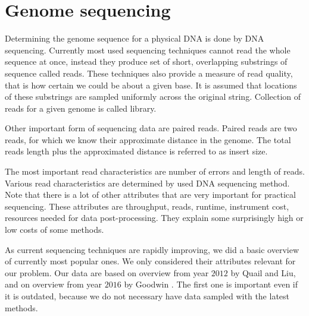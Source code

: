 \section{Genome sequencing}

Determining the genome sequence for a physical DNA is done by DNA sequencing. 
Currently most used sequencing techniques cannot read the whole sequence at once,
instead they produce set of short, overlapping substrings of sequence called reads. 
These techniques also provide a measure of read quality, that is how certain we could be about a given base.
It is assumed that locations of these substrings are sampled uniformly across the original string.
Collection of reads for a given genome is called library.

Other important form of sequencing data are paired reads. 
Paired reads are two reads, for which we know their approximate distance in the genome. 
The total reads length plus the approximated distance is referred to as insert size.

The most important read characteristics are number of errors and length of reads. 
Various read characteristics are determined by used DNA sequencing method.
Note that there is a lot of other attributes that are very important for practical sequencing.
These attributes are throughput, reads, runtime, instrument cost, resources needed for data post-processing.
They explain some surprisingly high or low costs of some methods.

As current sequencing techniques are rapidly improving, we did a basic overview of currently most popular ones. We only considered their attributes relevant for our problem. 
Our data are based on overview from year $2012$ by Quail\cite{quail2012tale} and Liu\cite{liu2012comparison}, 
and on overview from year $2016$ by Goodwin \cite{goodwin2016coming}. 
The first one is important even if it is outdated, 
because we do not necessary have data sampled with the latest methods.

